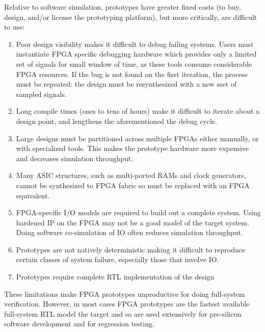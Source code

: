 Relative to software simulation, prototypes have greater fixed costs (to buy, design, and/or license the 
prototyping platform), but more critically, are difficult to use:
\begin{enumerate}
    \item Poor design visibility makes it difficult to debug failing systems. Users must instantiate
        FPGA specific debugging hardware which provides only a limited set of
        signals for small window of time, as these tools consume considerable
        FPGA resources.  If the bug is not found on the first iteration, the
        process must be repeated: the design must be resynthesized with a new
        sset of sampled signals.

    \item Long compile times (ones to tens of hours) make it difficult to
        iterate about a design point, and lengthens the aforementioned the debug cycle.

    \item Large designs must be partitioned across multiple FPGAs either
        manually, or with specialized tools. This makes the prototype hardware
        more expensive and decreases simulation throughput.

    \item Many ASIC structures, such as multi-ported RAMs and clock generators,
        cannot be synthesized to FPGA fabric so must be replaced with an FPGA
        equivalent.

    \item FPGA-specific I/O models are required to build out a complete system. Using hardened
        IP on the FPGA may not be a good model of the target system. Doing software co-simulation of IO
        often reduces simulation throughput.

    \item Prototypes are not natively deterministic making it difficult to
        reproduce certain classes of system failure, especially those that
        involve IO.

    \item Prototypes require complete RTL implementation of the design
\end{enumerate}

These limitations make FPGA prototypes unproductive for doing full-system
verification. However, in most cases FPGA prototypes are the fastest available
full-system RTL model the target and so are used extensively for
pre-silicon software development and for regression testing.

